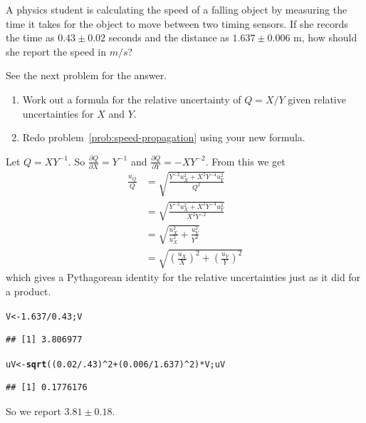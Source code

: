 \documentclass[twoside]{book}\usepackage[]{graphicx}\usepackage[]{xcolor}
\makeatletter
\newcommand{\hlnum}[1]{\textcolor[rgb]{0.686,0.059,0.569}{#1}}%
\newcommand{\hlopt}[1]{\textcolor[rgb]{0,0,0}{#1}}%
\newcommand{\hlstd}[1]{\textcolor[rgb]{0.345,0.345,0.345}{#1}}%
\newcommand{\hlkwb}[1]{\textcolor[rgb]{0.69,0.353,0.396}{#1}}%
\newcommand{\hlkwd}[1]{\textcolor[rgb]{0.737,0.353,0.396}{\textbf{#1}}}%
\newenvironment{kframe}{%
 \def\at@end@of@kframe{}%
 \ifinner\ifhmode%
  \def\at@end@of@kframe{\end{minipage}}%
  \begin{minipage}{\columnwidth}%
 \fi\fi%
 \def\FrameCommand##1{\hskip\@totalleftmargin \hskip-\fboxsep
 \colorbox{shadecolor}{##1}\hskip-\fboxsep
     \hskip-\linewidth \hskip-\@totalleftmargin \hskip\columnwidth}%
 \MakeFramed {\advance\hsize-\width
   \@totalleftmargin\z@ \linewidth\hsize
   \@setminipage}}%
 {\par\unskip\endMakeFramed%
 \at@end@of@kframe}
\newenvironment{knitrout}{}{} %
\newcommand{\Partial}[2]{\frac{\partial #1}{\partial #2}}
\makeatother
\begin{document}
\begin{problem}
	\label{prob:speed-propagation}%
	A physics student is calculating the speed of a falling object by measuring the time
	it takes for the object to move between two timing sensors.
	If she records the time as $0.43 \pm 0.02$ seconds and the distance as 
	$1.637 \pm 0.006$ m, how should she report the speed in $m/s$?
\end{problem}

\begin{solution}
	See the next problem for the answer.
\end{solution}


\begin{problem}
	\begin{enumerate}
		\item
			Work out a formula for the relative uncertainty of $Q = X/Y$ given
			relative uncertainties for $X$ and $Y$.
		\item
			Redo problem~\ref{prob:speed-propagation} using your new formula.
	\end{enumerate}
\end{problem}

\begin{solution}
	Let $Q = X Y^{-1}$.  So 
	$\Partial{Q}{X} = Y^{-1}$ and 
	$\Partial{Q}{Y} = -X Y^{-2}$.  From this we get
\begin{align*}
\frac{u_Q}{Q} 
& = \sqrt{ \frac{ Y^{-2} u_X^2 + X^2 Y^{-4} u_Y^2}{Q^2} }
\\
& = \sqrt{ \frac{ Y^{-2} u_X^2 + X^2 Y^{-4} u_Y^2}{X^2Y^{-2}} }
\\
& = \sqrt{ \frac{ u_X^2}{u_X^2} + \frac{u_Y^2}{Y^2} }
\\
& = \sqrt{ \left(\frac{ u_X}{X}\right)^2 + \left(\frac{u_Y}{Y}\right)^2 }
\end{align*}
which gives a Pythagorean identity for the relative uncertainties just as it 
did for a product.

\begin{knitrout}
\color{fgcolor}\begin{kframe}
\begin{alltt}
\hlstd{V} \hlkwb{<-} \hlnum{1.637} \hlopt{/} \hlnum{0.43}\hlstd{; V}
\end{alltt}
\begin{verbatim}
## [1] 3.806977
\end{verbatim}
\begin{alltt}
\hlstd{uV} \hlkwb{<-} \hlkwd{sqrt}\hlstd{( (}\hlnum{0.02}\hlopt{/}\hlnum{.43}\hlstd{)}\hlopt{^}\hlnum{2} \hlopt{+} \hlstd{(}\hlnum{0.006}\hlopt{/}\hlnum{1.637}\hlstd{)}\hlopt{^}\hlnum{2} \hlstd{)} \hlopt{*} \hlstd{V; uV}
\end{alltt}
\begin{verbatim}
## [1] 0.1776176
\end{verbatim}
\end{kframe}
\end{knitrout}
So we report
$3.81 \pm 0.18$.
\end{solution}
\end{document}
